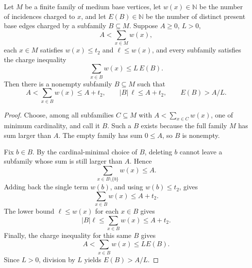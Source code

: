 \begin{lemma}
Let \(M\) be a finite family of medium base vertices, let
\(w(x)\in\mathbb N\) be the number of incidences charged to \(x\), and let
\(E(B)\in\mathbb N\) be the number of distinct present base edges charged by a
subfamily \(B\subseteq M\).  Suppose \(A\ge0\), \(L>0\),
\[
A<\sum_{x\in M} w(x),
\]
each \(x\in M\) satisfies \(w(x)\le t_2\) and
\(\ell\le w(x)\), and every subfamily satisfies the charge inequality
\[
\sum_{x\in B} w(x)\le L\,E(B).
\]
Then there is a nonempty subfamily \(B\subseteq M\) such that
\[
A<\sum_{x\in B} w(x)\le A+t_2,\qquad
|B|\,\ell\le A+t_2,\qquad
E(B)>A/L.
\]
\end{lemma}
\begin{proof}
Choose, among all subfamilies \(C\subseteq M\) with
\(A<\sum_{x\in C}w(x)\), one of minimum cardinality, and call it \(B\).
Such a \(B\) exists because the full family \(M\) has sum larger than \(A\).
The empty family has sum \(0\le A\), so \(B\) is nonempty.

Fix \(b\in B\).  By the cardinal-minimal choice of \(B\), deleting \(b\)
cannot leave a subfamily whose sum is still larger than \(A\).  Hence
\[
\sum_{x\in B\setminus\{b\}}w(x)\le A.
\]
Adding back the single term \(w(b)\), and using \(w(b)\le t_2\), gives
\[
\sum_{x\in B}w(x)\le A+t_2.
\]
The lower bound \(\ell\le w(x)\) for each \(x\in B\) gives
\[
|B|\ell\le \sum_{x\in B}w(x)\le A+t_2.
\]
Finally, the charge inequality for this same \(B\) gives
\[
A<\sum_{x\in B}w(x)\le L E(B).
\]
Since \(L>0\), division by \(L\) yields \(E(B)>A/L\).
\end{proof}
